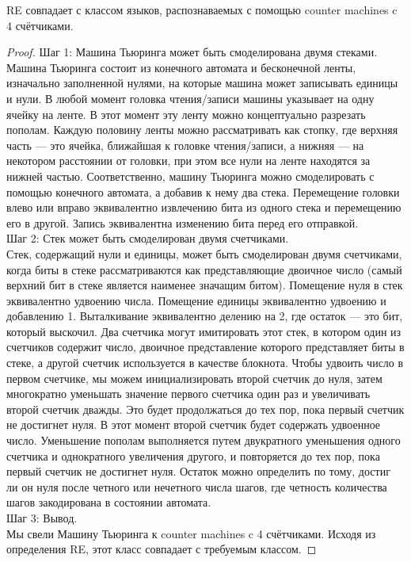     
    \begin{Thm}
         RE совпадает с классом языков, распознаваемых с помощью counter machines c 4 счётчиками.
    \end{Thm}
    \begin{proof}
        Шаг 1: Машина Тьюринга может быть смоделирована двумя стеками.\\
        Машина Тьюринга состоит из конечного автомата и бесконечной ленты, изначально заполненной нулями, на которые машина может записывать единицы и нули. В любой момент головка чтения/записи машины указывает на одну ячейку на ленте. В этот момент эту ленту можно концептуально разрезать пополам. Каждую половину ленты можно рассматривать как стопку, где верхняя часть — это ячейка, ближайшая к головке чтения/записи, а нижняя — на некотором расстоянии от головки, при этом все нули на ленте находятся за нижней частью. Соответственно, машину Тьюринга можно смоделировать с помощью конечного автомата, а добавив к нему два стека. Перемещение головки влево или вправо эквивалентно извлечению бита из одного стека и перемещению его в другой. Запись эквивалентна изменению бита перед его отправкой.\\
        Шаг 2: Стек может быть смоделирован двумя счетчиками.\\
        Стек, содержащий нули и единицы, может быть смоделирован двумя счетчиками, когда биты в стеке рассматриваются как представляющие двоичное число (самый верхний бит в стеке является наименее значащим битом). Помещение нуля в стек эквивалентно удвоению числа. Помещение единицы эквивалентно удвоению и добавлению 1. Выталкивание эквивалентно делению на 2, где остаток --- это бит, который выскочил. Два счетчика могут имитировать этот стек, в котором один из счетчиков содержит число, двоичное представление которого представляет биты в стеке, а другой счетчик используется в качестве блокнота. Чтобы удвоить число в первом счетчике, мы можем инициализировать второй счетчик до нуля, затем многократно уменьшать значение первого счетчика один раз и увеличивать второй счетчик дважды. Это будет продолжаться до тех пор, пока первый счетчик не достигнет нуля. В этот момент второй счетчик будет содержать удвоенное число. Уменьшение пополам выполняется путем двукратного уменьшения одного счетчика и однократного увеличения другого, и повторяется до тех пор, пока первый счетчик не достигнет нуля. Остаток можно определить по тому, достиг ли он нуля после четного или нечетного числа шагов, где четность количества шагов закодирована в состоянии автомата.\\
        Шаг 3: Вывод.\\
        Мы свели Машину Тьюринга к counter machines c 4 счётчиками. Исходя из определения RE, этот класс совпадает с требуемым классом.
    \end{proof}
    
